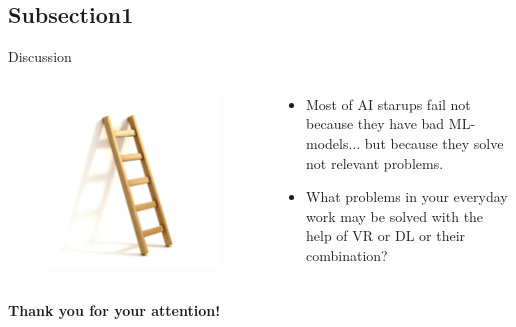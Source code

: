 \documentclass[10pt, xcolor=x11names,compress]{beamer}
\begin{document}
\subsection{Subsection1}
\begin{frame}{Discussion}
	\begin{columns}
		\begin{column}{0.45\textwidth}
			\begin{figure}
				\centering
				\includegraphics[width=\textwidth]{images/ladder.jpg}
			\end{figure}
		\end{column}
		\begin{column}{0.55\textwidth}
			\begin{itemize}
				\item Most of AI starups fail not because they have bad ML-models... but because they solve not relevant problems.
				\item What problems in your everyday work may be solved with the help of VR or DL or their combination?
			\end{itemize}
		\end{column}
	\end{columns}
\centering
\textbf{Thank you for your attention!}
\end{frame}
\end{document}
